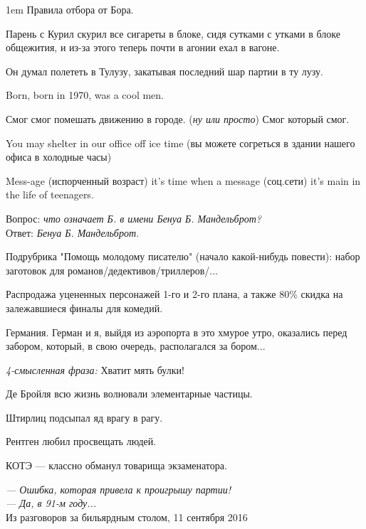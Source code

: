 \begin{flushleft}\parskip1em
Правила отбора от Бора.

Парень с Курил скурил все сигареты в блоке, сидя сутками с утками в блоке общежития, и из-за этого теперь почти в агонии ехал в вагоне.

Он думал полететь в Тулузу, закатывая последний шар партии в ту лузу.

Born, born in 1970, was a cool men.

Смог смог помешать движению в городе. (\emph{ну или просто}) Смог который смог.

You may shelter in our office off ice time (вы можете согреться в здании нашего офиса в холодные часы)

Mess-age (испорченный возраст) it's time when a message (соц.сети) it's main in the life of teenagers.

Вопрос: \emph{что означает Б. в имени Бенуа Б. Мандельброт?}\\
Ответ: \emph{Бенуа Б. Мандельброт.}

Подрубрика "Помощь молодому писателю" (начало какой-нибудь повести): набор заготовок для романов/дедективов/триллеров/...

Распродажа уцененных персонажей 1-го и 2-го плана, а также 80\% скидка на залежавшиеся финалы для комедий.

Германия. Герман и я, выйдя из аэропорта в это хмурое утро, оказались перед забором, который, в свою очередь, располагался за бором...

\emph{4-смысленная фраза:} Хватит мять булки!


Де Бройля всю жизнь волновали элементарные частицы.


Штирлиц подсыпал яд врагу в рагу.


Рентген любил просвещать людей.


КОТЭ --- классно обманул товарища экзаменатора.


\emph{--- Ошибка, которая привела к проигрышу партии!\\
--- Да, в 91-м году...}\\
Из разговоров за бильярдным столом, 11 сентября 2016 
\end{flushleft}
